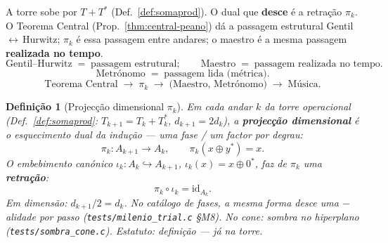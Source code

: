 \documentclass[11pt,a4paper]{article}
\newtheorem{definicao}{Definição}
\newcommand{\code}[1]{\texttt{#1}}
\begin{document}
A torre sobe por $T+T^{*}$ (Def.~\ref{def:somaprod}). O dual que
\textbf{desce} é a retração $\pi_k$. O Teorema Central
(Prop.~\ref{thm:central-peano}) dá a passagem estrutural
Gentil\,$\leftrightarrow$\,Hurwitz; $\pi_k$ é essa passagem entre
andares; o maestro é a mesma passagem \textbf{realizada no tempo}.
\[
\boxed{
\text{Gentil--Hurwitz}
\;=\;
\text{passagem estrutural};
\qquad
\text{Maestro}
\;=\;
\text{passagem realizada no tempo}.
}
\]
\[
\boxed{
\text{Metrónomo}
\;=\;
\text{passagem lida (métrica)}.
}
\]
\[
\boxed{
\text{Teorema Central}
\;\longrightarrow\;
\pi_k
\;\longrightarrow\;
\bigl(\text{Maestro},\,\text{Metrónomo}\bigr)
\;\longrightarrow\;
\text{Música}.
}
\]

\begin{definicao}[Projecção dimensional $\pi_k$]\label{def:pi-k}
Em cada andar $k$ da torre operacional
(Def.~\ref{def:somaprod}: $T_{k+1}=T_k+T_k^{*}$,
$d_{k+1}=2d_k$), a \textbf{projecção dimensional} é o esquecimento
dual da indução --- uma fase / um factor por degrau:
\[
\boxed{
\pi_k\colon A_{k+1}\longrightarrow A_k,
\qquad
\pi_k(x\oplus y^{*})=x.
}
\]
O embebimento canónico $\iota_k\colon A_k\hookrightarrow A_{k+1}$,
$\iota_k(x)=x\oplus 0^{*}$, faz de $\pi_k$ uma \textbf{retração}:
\[
\boxed{
\pi_k\circ\iota_k=\mathrm{id}_{A_k}.
}
\]
Em dimensão: $d_{k+1}/2=d_k$. No catálogo de fases, a mesma forma
desce uma $-$alidade por passo (\code{tests/milenio\_trial.c} §M8).
No cone: sombra no hiperplano (\code{tests/sombra\_cone.c}). Estatuto:
\emph{definição} --- já na torre.
\end{definicao}
\end{document}
